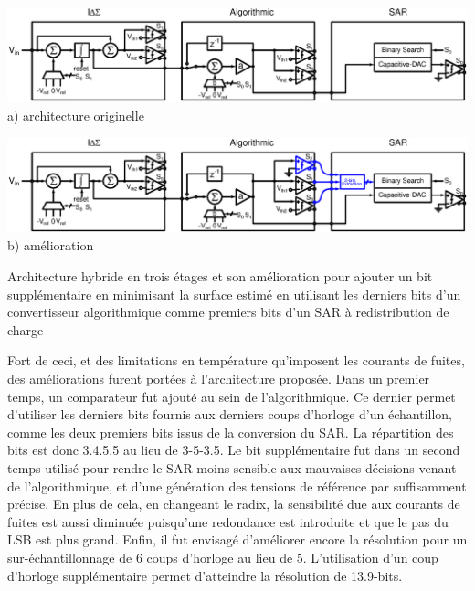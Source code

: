 \begin{mdframed}[linecolor=Prune,linewidth=1]
\begin{center}
    \centering
    \begin{minipage}[b]{\textwidth}
        \centering
        \includegraphics[width=\textwidth]{Chapter4/Figs/architecture-full-principle.ps}
        a) architecture originelle
        \vspace{2em}
    \end{minipage}
    \begin{minipage}[b]{\textwidth}
        \centering
        \includegraphics[width=\textwidth]{Chapter4/Figs/architecture-full-principle-final.ps}
        b) amélioration
    \end{minipage}
	\caption[]{Architecture hybride en trois étages et son amélioration pour ajouter un bit supplémentaire en minimisant la surface estimé en utilisant les derniers bits d'un convertisseur algorithmique comme premiers bits d'un SAR à redistribution de charge}
	\label{fig:final-prop-adc-architecture}
\end{center}
Fort de ceci, et des limitations en température qu'imposent les courants de fuites, des améliorations furent portées à l'architecture proposée. Dans un premier temps, un comparateur fut ajouté au sein de l'algorithmique. Ce dernier permet d'utiliser les derniers bits fournis aux derniers coups d'horloge d'un échantillon, comme les deux premiers bits issus de la conversion du SAR\@. La répartition des bits est donc 3.4.5.5 au lieu de 3-5-3.5. Le bit supplémentaire fut dans un second temps utilisé pour rendre le SAR moins sensible aux mauvaises décisions venant de l'algorithmique, et d'une génération des tensions de référence par suffisamment précise. En plus de cela, en changeant le radix, la sensibilité due aux courants de fuites est aussi diminuée puisqu'une redondance est introduite et que le pas du LSB est plus grand. Enfin, il fut envisagé d'améliorer encore la résolution pour un sur-échantillonnage de 6 coups d'horloge au lieu de 5. L'utilisation d'un coup d'horloge supplémentaire permet d'atteindre la résolution de 13.9-bits.


\end{mdframed}
